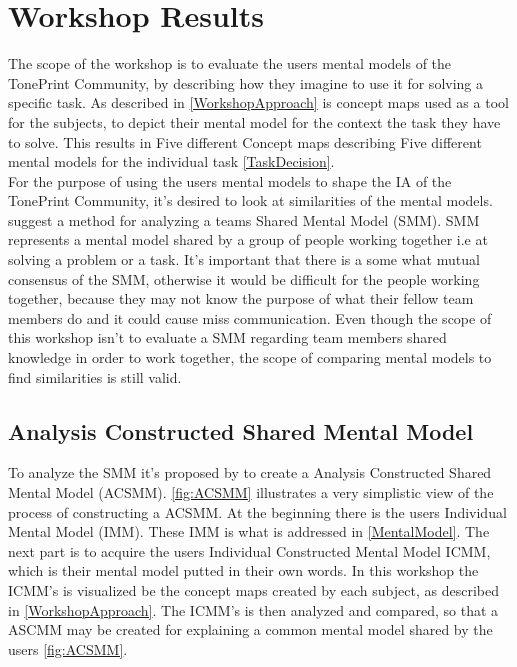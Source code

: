 \chapter{Workshop Results}
\label{Chap:WorkshopResults}

The scope of the workshop is to evaluate the users mental models of the TonePrint Community, by describing how they imagine to use it for solving a specific task. As described in \autoref{WorkshopApproach} is concept maps used as a tool for the subjects, to depict their mental model for the context the task they have to solve. This results in Five different Concept maps describing Five different mental models for the individual task \autoref{TaskDecision}. \\
For the purpose of using the users mental models to shape the IA of the TonePrint Community, it's desired to look at similarities of the mental models. \textcite{WEB:ConceptMapAnalysis} suggest a method for analyzing a teams Shared Mental Model (SMM). SMM represents a mental model shared by a group of people working together i.e  at solving a problem or a task. It's important that there is a some what mutual consensus of the SMM, otherwise it would be difficult for the people working together, because they may not know the purpose of what their fellow team members do and it could cause miss communication. Even though the scope of this workshop isn't to evaluate a SMM regarding team members shared knowledge in order to work together, the scope of comparing mental models to find similarities is still valid. 

\section{Analysis Constructed Shared Mental Model}
\label{ACSMM}
To analyze the SMM it's proposed by \textcite{WEB:ConceptMapAnalysis} to create a Analysis Constructed Shared Mental Model (ACSMM). \autoref{fig:ACSMM} illustrates a very simplistic view of the process of constructing a ACSMM. At the beginning there is the users Individual Mental Model (IMM). These IMM is what is addressed in \autoref{MentalModel}. The next part is to acquire the users Individual Constructed Mental Model ICMM, which is their mental model putted in their own words. In this workshop the ICMM's is visualized be the concept maps created by each subject, as described in \autoref{WorkshopApproach}. The ICMM's is then analyzed and compared, so that a ASCMM may be created for explaining a common mental model shared by the users \autoref{fig:ACSMM}.  

